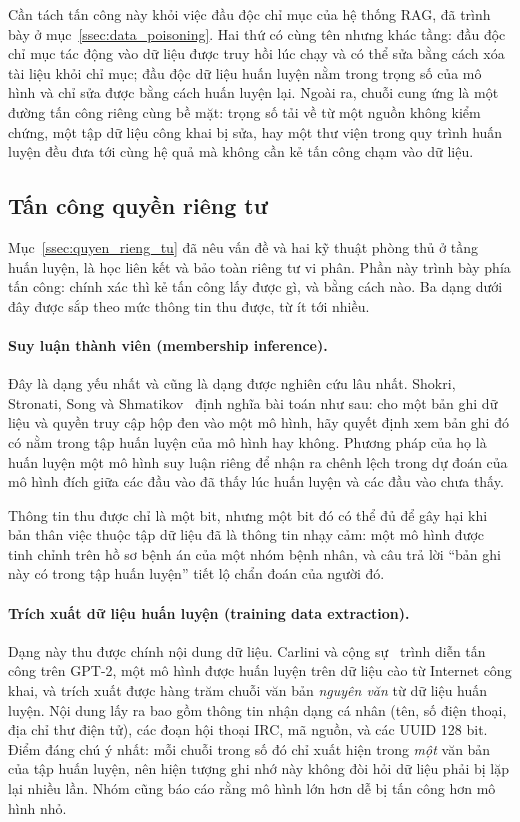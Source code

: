 Cần tách tấn công này khỏi việc đầu độc chỉ mục của hệ thống RAG, đã trình bày ở mục~\ref{ssec:data_poisoning}. Hai thứ có cùng tên nhưng khác tầng: đầu độc chỉ mục tác động vào dữ liệu được truy hồi lúc chạy và có thể sửa bằng cách xóa tài liệu khỏi chỉ mục; đầu độc dữ liệu huấn luyện nằm trong trọng số của mô hình và chỉ sửa được bằng cách huấn luyện lại. Ngoài ra, chuỗi cung ứng là một đường tấn công riêng cùng bề mặt: trọng số tải về từ một nguồn không kiểm chứng, một tập dữ liệu công khai bị sửa, hay một thư viện trong quy trình huấn luyện đều đưa tới cùng hệ quả mà không cần kẻ tấn công chạm vào dữ liệu.

\subsection{Tấn công quyền riêng tư}
\label{ssec:privacy_attacks}

Mục~\ref{ssec:quyen_rieng_tu} đã nêu vấn đề và hai kỹ thuật phòng thủ ở tầng huấn luyện, là học liên kết và bảo toàn riêng tư vi phân. Phần này trình bày phía tấn công: chính xác thì kẻ tấn công lấy được gì, và bằng cách nào. Ba dạng dưới đây được sắp theo mức thông tin thu được, từ ít tới nhiều.

\paragraph{Suy luận thành viên (membership inference).} Đây là dạng yếu nhất và cũng là dạng được nghiên cứu lâu nhất. Shokri, Stronati, Song và Shmatikov~\cite{shokri2017membership} định nghĩa bài toán như sau: cho một bản ghi dữ liệu và quyền truy cập hộp đen vào một mô hình, hãy quyết định xem bản ghi đó có nằm trong tập huấn luyện của mô hình hay không. Phương pháp của họ là huấn luyện một mô hình suy luận riêng để nhận ra chênh lệch trong dự đoán của mô hình đích giữa các đầu vào đã thấy lúc huấn luyện và các đầu vào chưa thấy.

Thông tin thu được chỉ là một bit, nhưng một bit đó có thể đủ để gây hại khi bản thân việc thuộc tập dữ liệu đã là thông tin nhạy cảm: một mô hình được tinh chỉnh trên hồ sơ bệnh án của một nhóm bệnh nhân, và câu trả lời ``bản ghi này có trong tập huấn luyện'' tiết lộ chẩn đoán của người đó.

\paragraph{Trích xuất dữ liệu huấn luyện (training data extraction).} Dạng này thu được chính nội dung dữ liệu. Carlini và cộng sự~\cite{carlini2021extracting} trình diễn tấn công trên GPT-2, một mô hình được huấn luyện trên dữ liệu cào từ Internet công khai, và trích xuất được hàng trăm chuỗi văn bản \emph{nguyên văn} từ dữ liệu huấn luyện. Nội dung lấy ra bao gồm thông tin nhận dạng cá nhân (tên, số điện thoại, địa chỉ thư điện tử), các đoạn hội thoại IRC, mã nguồn, và các UUID 128 bit. Điểm đáng chú ý nhất: mỗi chuỗi trong số đó chỉ xuất hiện trong \emph{một} văn bản của tập huấn luyện, nên hiện tượng ghi nhớ này không đòi hỏi dữ liệu phải bị lặp lại nhiều lần. Nhóm cũng báo cáo rằng mô hình lớn hơn dễ bị tấn công hơn mô hình nhỏ.

